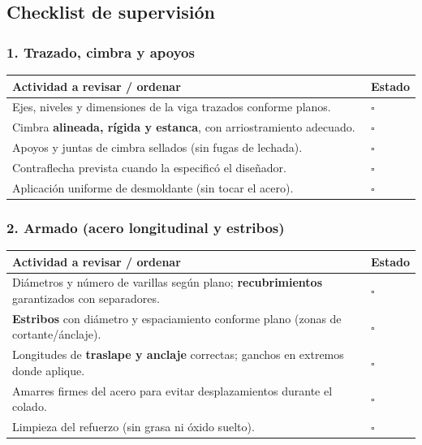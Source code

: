 \documentclass[12pt]{article}
\newcommand{\cbox}{\(\square\)} %
\begin{document}
	\subsection{Checklist de supervisión}
	
	\subsubsection*{1. Trazado, cimbra y apoyos}
	\begin{tabularx}{\linewidth}{>{\raggedright\arraybackslash}p{0.93\linewidth} >{\centering\arraybackslash}m{0.07\linewidth}}
		\toprule
		\textbf{Actividad a revisar / ordenar} & \textbf{Estado}\\
		\midrule
		Ejes, niveles y dimensiones de la viga trazados conforme planos. & \cbox \\
		Cimbra \textbf{alineada, rígida y estanca}, con arriostramiento adecuado. & \cbox \\
		Apoyos y juntas de cimbra sellados (sin fugas de lechada). & \cbox \\
		Contraflecha prevista cuando la especificó el diseñador. & \cbox \\
		Aplicación uniforme de desmoldante (sin tocar el acero). & \cbox \\
		\bottomrule
	\end{tabularx}
	
	\subsubsection*{2. Armado (acero longitudinal y estribos)}
	\begin{tabularx}{\linewidth}{>{\raggedright\arraybackslash}p{0.93\linewidth} >{\centering\arraybackslash}m{0.07\linewidth}}
		\toprule
		\textbf{Actividad a revisar / ordenar} & \textbf{Estado}\\
		\midrule
		Diámetros y número de varillas según plano; \textbf{recubrimientos} garantizados con separadores. & \cbox \\
		\textbf{Estribos} con diámetro y espaciamiento conforme plano (zonas de cortante/ánclaje). & \cbox \\
		Longitudes de \textbf{traslape y anclaje} correctas; ganchos en extremos donde aplique. & \cbox \\
		Amarres firmes del acero para evitar desplazamientos durante el colado. & \cbox \\
		Limpieza del refuerzo (sin grasa ni óxido suelto). & \cbox \\
		\bottomrule
	\end{tabularx}
	
\end{document}
